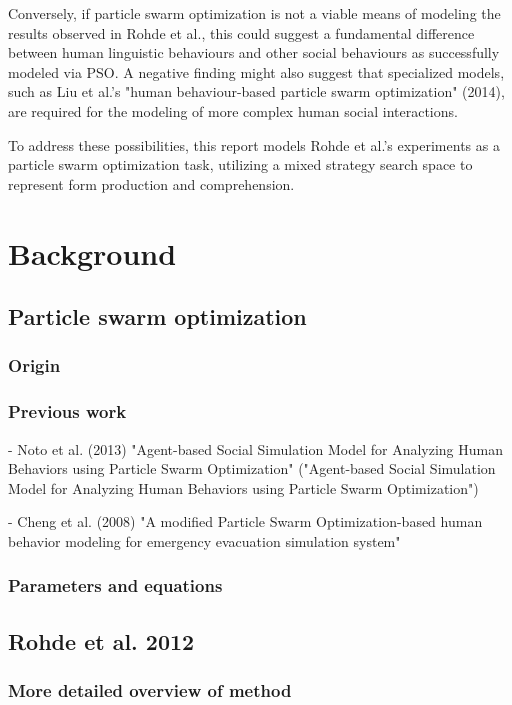 \documentclass[12pt]{article}
\begin{document}
Conversely, if particle swarm optimization is not a viable means of modeling the results observed in Rohde et al., this could suggest a fundamental difference between human linguistic behaviours and other social behaviours as successfully modeled via PSO. A negative finding might also suggest that specialized models, such as Liu et al.'s "human behaviour-based particle swarm optimization" (2014), are required for the modeling of more complex human social interactions.

To address these possibilities, this report models Rohde et al.'s experiments as a particle swarm optimization task, utilizing a mixed strategy search space to represent form production and comprehension.



\section{Background}
\subsection{Particle swarm optimization}
\subsubsection{Origin}
\subsubsection{Previous work}
- Noto et al. (2013) "Agent-based Social Simulation Model for Analyzing Human Behaviors using Particle Swarm Optimization" ("Agent-based Social Simulation Model for Analyzing Human Behaviors using Particle Swarm Optimization")

- Cheng et al. (2008) "A modified Particle Swarm Optimization-based human behavior modeling for emergency evacuation simulation system"
\subsubsection{Parameters and equations}

\subsection{Rohde et al. 2012}
\subsubsection{More detailed overview of method}
\end{document}
